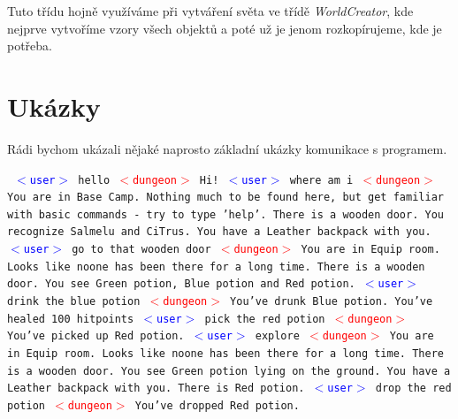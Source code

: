 \documentclass[11pt, a4paper]{article}
\def\class#1{\emph{#1}}
\newenvironment{example}%
{\smallskip\noindent\ignorespaces\obeylines\tt}%
{\smallskip\par\noindent
\ignorespacesafterend}
\def\user{\textcolor{blue}{$<$user$>$ }}
\def\dung{\textcolor{red}{$<$dungeon$>$ }}
\begin{document}
Tuto třídu hojně využíváme při vytváření světa ve třídě \class{WorldCreator}, kde nejprve vytvoříme vzory všech objektů a poté už je jenom rozkopírujeme, kde je potřeba.

\section{Ukázky}

Rádi bychom ukázali nějaké naprosto základní ukázky komunikace s programem.

\begin{example}
\user hello
\dung Hi!
\user where am i
\dung You are in Base Camp. Nothing much to be found here, but get
familiar with basic commands - try to type 'help'. There is a wooden
door. You recognize Salmelu and CiTrus. You have a Leather backpack 
with you.
\user go to that wooden door
\dung You are in Equip room. Looks like noone has been there for 
a long time. There is a wooden door. You see Green potion, Blue potion 
and Red potion. 
\user drink the blue potion
\dung You've drunk Blue potion. You've healed 100 hitpoints
\user pick the red potion
\dung You've picked up Red potion.
\user explore
\dung You are in Equip room. Looks like noone has been there for 
a long time. There is a wooden door. You see Green potion lying on the 
ground. You have a Leather backpack with you. There is Red potion.
\user drop the red potion
\dung You've dropped Red potion. 
\end{example}
\end{document}
